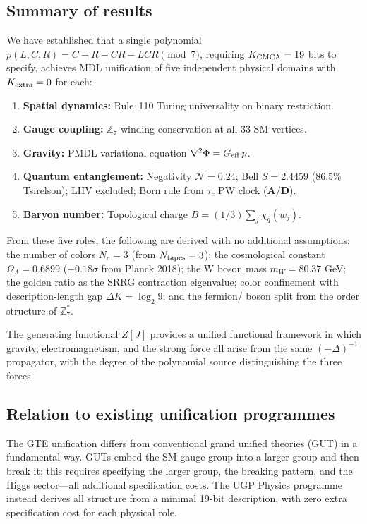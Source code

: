 \documentclass[11pt]{article}
\theoremstyle{remark}
\newcommand{\ZS}{\mathbb{Z}_7}
\newcommand{\ZSstar}{\mathbb{Z}_7^*}
\newcommand{\OmegaL}{\Omega_\Lambda}
\newcommand{\CatAD}{\textbf{A/D}}
\begin{document}
\subsection{Summary of results}
\label{ssec:summary}

We have established that a single polynomial $p(L,C,R) = C+R-CR-LCR\pmod7$,
requiring $K_{\rm CMCA} = 19$ bits to specify, achieves MDL unification of five
independent physical domains with $K_{\rm extra} = 0$ for each:
\begin{enumerate}[label=(\arabic*),itemsep=2pt]
\item \textbf{Spatial dynamics:} Rule~110 Turing universality on binary restriction.
\item \textbf{Gauge coupling:} $\ZS$ winding conservation at all 33 SM vertices.
\item \textbf{Gravity:} PMDL variational equation $\nabla^2\Phi = G_{\rm eff}\,p$.
\item \textbf{Quantum entanglement:} Negativity $\mathcal{N}=0.24$; Bell $S=2.4459$
      ($86.5\%$ Tsirelson); LHV excluded; Born rule from $\tau_c$ PW clock ($\CatAD$).
\item \textbf{Baryon number:} Topological charge $B = (1/3)\sum_j\chi_q(w_j)$.
\end{enumerate}

From these five roles, the following are derived with no additional assumptions:
the number of colors $N_c = 3$ (from $N_{\rm tapes} = 3$); the cosmological
constant $\OmegaL = 0.6899$ ($+0.18\sigma$ from Planck 2018); the W boson mass
$m_W = 80.37$ GeV; the golden ratio as the SRRG contraction eigenvalue; color
confinement with description-length gap $\Delta K = \log_2 9$; and the fermion/
boson split from the order structure of $\ZSstar$.

The generating functional $Z[J]$ provides a unified functional framework in
which gravity, electromagnetism, and the strong force all arise from the same
$(-\Delta)^{-1}$ propagator, with the degree of the polynomial source distinguishing
the three forces.

\subsection{Relation to existing unification programmes}
\label{ssec:relation}

The GTE unification differs from conventional grand unified theories (GUT) in
a fundamental way. GUTs embed the SM gauge group into a larger group and then
break it; this requires specifying the larger group, the breaking pattern, and
the Higgs sector---all additional specification costs. The UGP Physics programme instead
derives all structure from a minimal 19-bit description, with zero extra
specification cost for each physical role.
\end{document}
